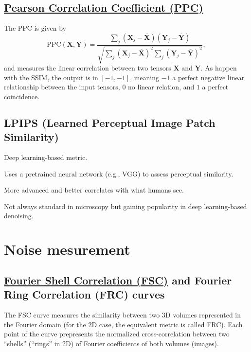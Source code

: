 \documentclass{article}
\begin{document}

\subsection{\href{https://en.wikipedia.org/wiki/Pearson_correlation_coefficient}{Pearson Correlation Coefficient (PPC)}}

The PPC is given
by
\begin{equation}
  \text{PPC}(\mathbf{X}, \mathbf{Y}) = \frac{\sum_j(\mathbf{X}_j - \overline{\mathbf{X}})(\mathbf{Y}_j - \overline{\mathbf{Y}})}{\sqrt{\sum_j (\mathbf{X}_j - \overline{\mathbf{X}})^2 \sum_j (\mathbf{Y}_j - \overline{\mathbf{Y}})^2}},
\end{equation}
and measures the linear correlation between two tensors $\mathbf{X}$
and $\mathbf{Y}$.  As happen with the SSIM, the output is in
$[-1, -1]$, meaning $-1$ a perfect negative linear relationship
between the input tensors, $0$ no linear relation, and $1$ a perfect
coincidence.


\subsection{LPIPS (Learned Perceptual Image Patch Similarity)}

    Deep learning-based metric.

    Uses a pretrained neural network (e.g., VGG) to assess perceptual similarity.

    More advanced and better correlates with what humans see.

    Not always standard in microscopy but gaining popularity in deep learning-based denoising.


\section{Noise mesurement}

\subsection{\href{https://en.wikipedia.org/wiki/Fourier_shell_correlation}{Fourier
    Shell Correlation (FSC)} and Fourier Ring Correlation (FRC)
  curves}
\label{sec:fourier_correlation}

The FSC curve measures the similarity between two 3D volumes
represented in the Fourier domain \cite{verbeke2024self} (for the 2D
case, the equivalent metric is called FRC). Each point of the curve
prepresents the normalized cross-correlation between two ``shells''
(``rings'' in 2D) of Fourier coefficients of both volumes
(images). 
\end{document}
